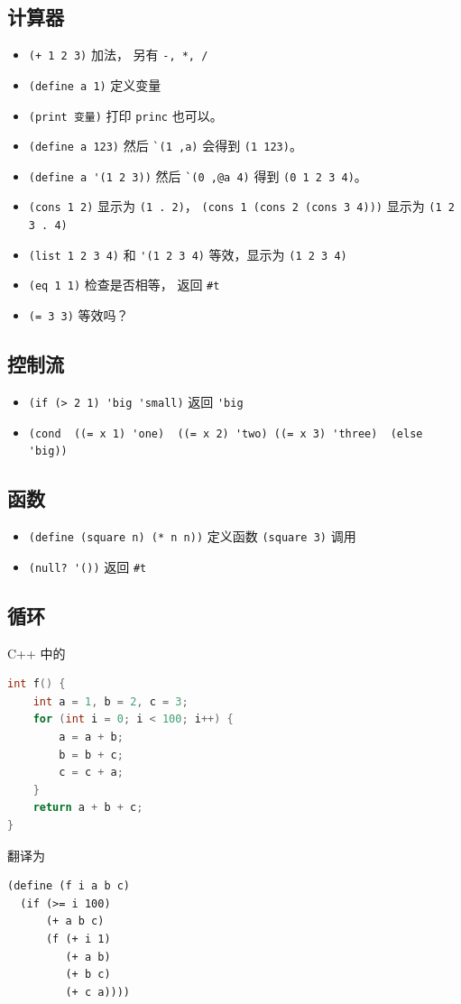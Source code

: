 \subsection{计算器}
\begin{itemize}
\item \verb`(+ 1 2 3)` 加法， 另有 \verb`-, *, /`
\item \verb`(define a 1)` 定义变量
\item \verb`(print 变量)` 打印 \verb`princ` 也可以。
\item \verb`(define a 123)` 然后 \verb|`(1 ,a)| 会得到 \verb`(1 123)`。
\item \verb`(define a '(1 2 3))` 然后 \verb|`(0 ,@a 4)| 得到 \verb`(0 1 2 3 4)`。
\item \verb`(cons 1 2)` 显示为 \verb`(1 . 2)`， \verb`(cons 1 (cons 2 (cons 3 4)))` 显示为 \verb`(1 2 3 . 4)`
\item \verb`(list 1 2 3 4)` 和 \verb`'(1 2 3 4)` 等效，显示为 \verb`(1 2 3 4)`
\item \verb`(eq 1 1)` 检查是否相等， 返回 \verb`#t`
\item \verb`(= 3 3)` 等效吗？
\end{itemize}

\subsection{控制流}
\begin{itemize}
\item \verb`(if (> 2 1) 'big 'small)` 返回 \verb`'big`
\item \verb`(cond  ((= x 1) 'one)  ((= x 2) 'two) ((= x 3) 'three)  (else 'big))`
\end{itemize}

\subsection{函数}
\begin{itemize}
\item \verb`(define (square n) (* n n))` 定义函数 \verb`(square 3)` 调用
\item \verb`(null? '())` 返回 \verb`#t`
\end{itemize}

\subsection{循环}
C++ 中的
\begin{lstlisting}[language=cpp]
int f() {
    int a = 1, b = 2, c = 3;
    for (int i = 0; i < 100; i++) {
        a = a + b;
        b = b + c;
        c = c + a;
    }
    return a + b + c;
}
\end{lstlisting}
翻译为
\begin{lstlisting}[language=none]
(define (f i a b c)
  (if (>= i 100)
      (+ a b c)
      (f (+ i 1)
         (+ a b)
         (+ b c)
         (+ c a))))
\end{lstlisting}
